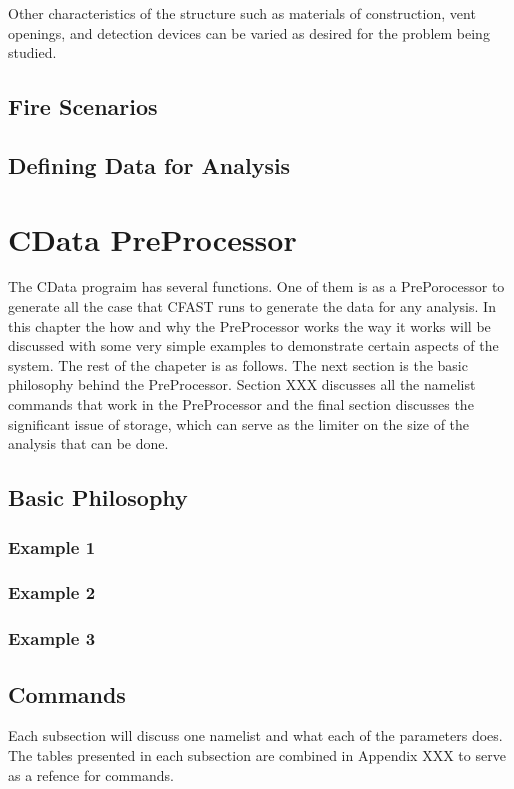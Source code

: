 \documentclass[12pt,twoside]{book}
\begin{document}
Other characteristics of the structure such as materials of construction, vent openings, and detection devices can be varied as desired for the problem being studied. 

\section{Fire Scenarios}

\section{Defining Data for Analysis}

%
%

\chapter{CData PreProcessor}
The CData prograim has several functions. One of them is as a PrePorocessor to generate all the case that CFAST runs to generate the data for any analysis. In this chapter the how and why the PreProcessor works the way it works will be discussed with some very simple examples to demonstrate certain aspects of the system. The rest of the chapeter is as follows. The next section is the basic philosophy behind the PreProcessor. Section XXX discusses all the namelist commands that work in the PreProcessor and the final section discusses the significant issue of storage, which can serve as the limiter on the size of the analysis that can be done.

\section{Basic Philosophy}

\subsection{Example 1}

\subsection{Example 2}

\subsection{Example 3}

\section{Commands}
Each subsection will discuss one namelist and what each of the parameters does. The tables presented in each subsection are combined in Appendix XXX  to serve as a refence for commands.
\end{document}
